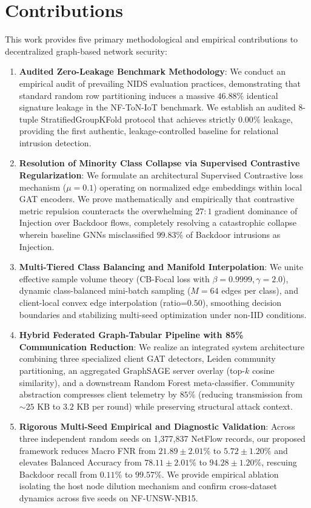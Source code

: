 \documentclass[12pt,a4paper]{report}
\begin{document}
\section{Contributions}\label{sec:contributions}

This work provides five primary methodological and empirical contributions to decentralized graph-based network security:
\begin{enumerate}
    \item \textbf{Audited Zero-Leakage Benchmark Methodology}: We conduct an empirical audit of prevailing NIDS evaluation practices, demonstrating that standard random row partitioning induces a massive $46.88\%$ identical signature leakage in the NF-ToN-IoT benchmark. We establish an audited 8-tuple StratifiedGroupKFold protocol that achieves strictly $0.00\%$ leakage, providing the first authentic, leakage-controlled baseline for relational intrusion detection.
    \item \textbf{Resolution of Minority Class Collapse via Supervised Contrastive Regularization}: We formulate an architectural Supervised Contrastive loss mechanism ($\mu=0.1$) operating on normalized edge embeddings within local GAT encoders. We prove mathematically and empirically that contrastive metric repulsion counteracts the overwhelming $27:1$ gradient dominance of Injection over Backdoor flows, completely resolving a catastrophic collapse wherein baseline GNNs misclassified $99.83\%$ of Backdoor intrusions as Injection.
    \item \textbf{Multi-Tiered Class Balancing and Manifold Interpolation}: We unite effective sample volume theory (CB-Focal loss with $\beta=0.9999, \gamma=2.0$), dynamic class-balanced mini-batch sampling ($M=64$ edges per class), and client-local convex edge interpolation (ratio=$0.50$), smoothing decision boundaries and stabilizing multi-seed optimization under non-IID conditions.
    \item \textbf{Hybrid Federated Graph-Tabular Pipeline with 85\% Communication Reduction}: We realize an integrated system architecture combining three specialized client GAT detectors, Leiden community partitioning, an aggregated GraphSAGE server overlay (top-$k$ cosine similarity), and a downstream Random Forest meta-classifier. Community abstraction compresses client telemetry by $85\%$ (reducing transmission from $\sim 25\text{ KB}$ to $3.2\text{ KB}$ per round) while preserving structural attack context.
    \item \textbf{Rigorous Multi-Seed Empirical and Diagnostic Validation}: Across three independent random seeds on 1,377,837 NetFlow records, our proposed framework reduces Macro FNR from $21.89 \pm 2.01\%$ to $5.72 \pm 1.20\%$ and elevates Balanced Accuracy from $78.11 \pm 2.01\%$ to $94.28 \pm 1.20\%$, rescuing Backdoor recall from $0.11\%$ to $99.57\%$. We provide empirical ablation isolating the host node dilution mechanism and confirm cross-dataset dynamics across five seeds on NF-UNSW-NB15.
\end{enumerate}
\end{document}
